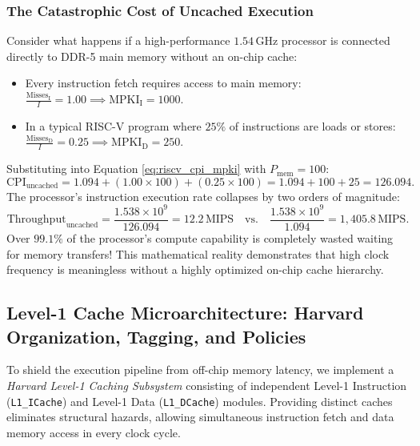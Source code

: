 \subsubsection{The Catastrophic Cost of Uncached Execution}
Consider what happens if a high-performance $1.54\,\text{GHz}$ processor is connected directly to DDR-5 main memory without an on-chip cache:
\begin{itemize}
    \item Every instruction fetch requires access to main memory: $\frac{\text{Misses}_{\text{I}}}{I} = 1.00 \implies \text{MPKI}_{\text{I}} = 1000$.
    \item In a typical RISC-V program where $25\%$ of instructions are loads or stores: $\frac{\text{Misses}_{\text{D}}}{I} = 0.25 \implies \text{MPKI}_{\text{D}} = 250$.
\end{itemize}
Substituting into Equation \ref{eq:riscv_cpi_mpki} with $P_{\text{mem}} = 100$:
\begin{equation}
\text{CPI}_{\text{uncached}} = 1.094 + (1.00 \times 100) + (0.25 \times 100) = 1.094 + 100 + 25 = 126.094.
\end{equation}
The processor's instruction execution rate collapses by two orders of magnitude:
\begin{equation}
\text{Throughput}_{\text{uncached}} = \frac{1.538 \times 10^9}{126.094} = 12.2\,\text{MIPS} \quad \text{vs.} \quad \frac{1.538 \times 10^9}{1.094} = 1,405.8\,\text{MIPS}.
\end{equation}
Over $\mathbf{99.1\%}$ of the processor's compute capability is completely wasted waiting for memory transfers! This mathematical reality demonstrates that high clock frequency is meaningless without a highly optimized on-chip cache hierarchy.

\subsection{Level-1 Cache Microarchitecture: Harvard Organization, Tagging, and Policies}\label{riscvCacheArch}

To shield the execution pipeline from off-chip memory latency, we implement a \textit{Harvard Level-1 Caching Subsystem} consisting of independent Level-1 Instruction (\texttt{L1\_ICache}) and Level-1 Data (\texttt{L1\_DCache}) modules. Providing distinct caches eliminates structural hazards, allowing simultaneous instruction fetch and data memory access in every clock cycle.

